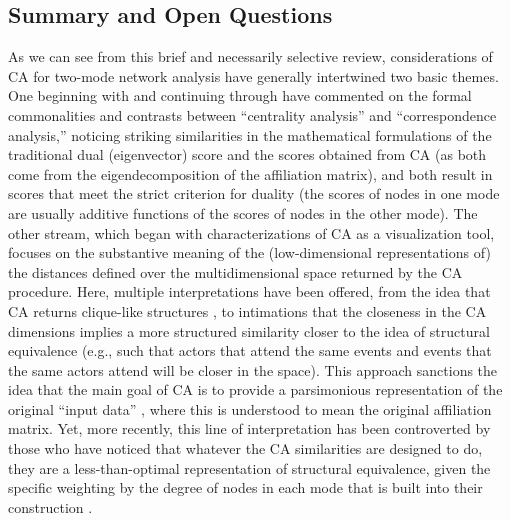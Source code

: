 \documentclass[a4paper,fleqn]{cas-sc}
\begin{document}
\subsection{Summary and Open Questions}
As we can see from this brief and necessarily selective review, considerations of CA for two-mode network analysis have generally intertwined two basic themes. One beginning with \citet{bonacich1991simultaneous} and continuing through \citet{faust1997centrality, faust2005using} have commented on the formal commonalities and contrasts between ``centrality analysis'' and ``correspondence analysis,'' noticing striking similarities in the mathematical formulations of the traditional dual (eigenvector) score and the scores obtained from CA (as both come from the eigendecomposition of the affiliation matrix), and both result in scores that meet the strict criterion for duality (the scores of nodes in one mode are usually additive functions of the scores of nodes in the other mode). The other stream, which began with characterizations of CA as a visualization tool, focuses on the substantive meaning of the (low-dimensional representations of) the distances defined over the multidimensional space returned by the CA procedure. Here, multiple interpretations have been offered, from the idea that CA returns clique-like structures \citep{bonacich1991simultaneous}, to intimations that the closeness in the CA dimensions implies a more structured similarity closer to the idea of structural equivalence (e.g., such that actors that attend the same events and events that the same actors attend will be closer in the space). This approach sanctions the idea that the main goal of CA is to provide a parsimonious representation of the original ``input data'' \citep{faust2005using}, where this is understood to mean the original affiliation matrix. Yet, more recently, this line of interpretation has been controverted by those who have noticed that whatever the CA similarities are designed to do, they are a less-than-optimal representation of structural equivalence, given the specific weighting by the degree of nodes in each mode that is built into their construction \citep{desposito2014comparison}. 
\end{document}
